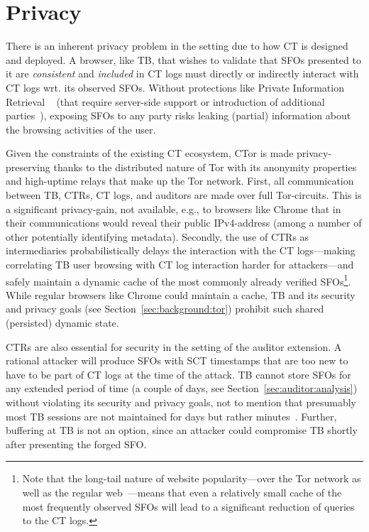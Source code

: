 \section{Privacy} \label{sec:privacy}
There is an inherent privacy problem in the setting due to how CT is designed
and deployed. A browser, like TB, that wishes to validate that SFOs presented to
it are \emph{consistent} and \emph{included} in CT logs must directly or
indirectly interact with CT logs wrt. its observed SFOs. Without protections
like Private Information Retrieval ~\cite{PIR} (that require server-side support
or introduction of additional parties~\cite{lueks-and-goldberg}), exposing SFOs
to any party risks leaking (partial) information about the browsing activities
of the user.

Given the constraints of the existing CT ecosystem, CTor is made
privacy-preserving thanks to the distributed nature of Tor with its anonymity
properties and high-uptime relays that make up the Tor network. First, all
communication between TB, CTRs, CT logs, and auditors are made over full
Tor-circuits. This is a significant privacy-gain, not available, e.g., to
browsers like Chrome that in their communications would reveal their public
IPv4-address (among a number of other potentially identifying metadata).
Secondly, the use of CTRs as intermediaries probabilistically delays the
interaction with the CT logs---making correlating TB user browsing with CT log
interaction harder for attackers---and safely maintain a dynamic cache of the
most commonly already verified SFOs\footnote{Note that the long-tail nature of
website popularity---over the Tor network as well as the regular
web~\cite{mani}---means that even a relatively small cache of the most
frequently observed SFOs will lead to a significant reduction of queries to the
CT logs.}. While regular browsers like Chrome could maintain a cache, TB and its
security and privacy goals (see Section~\ref{sec:background:tor}) prohibit such
shared (persisted) dynamic state.

CTRs are also essential for security in the setting of the auditor extension. A
rational attacker will produce SFOs with SCT timestamps that are too new to have
to be part of CT logs at the time of the attack. TB cannot store SFOs for any
extended period of time (a couple of days, see
Section~\ref{sec:auditor:analysis}) without violating its security and privacy
goals, not to mention that presumably most TB sessions are not maintained for
days but rather minutes~\cite{DBLP:conf/pam/AmannS16}. Further, buffering at TB
is not an option, since an attacker could compromise TB shortly after presenting
the forged SFO.

